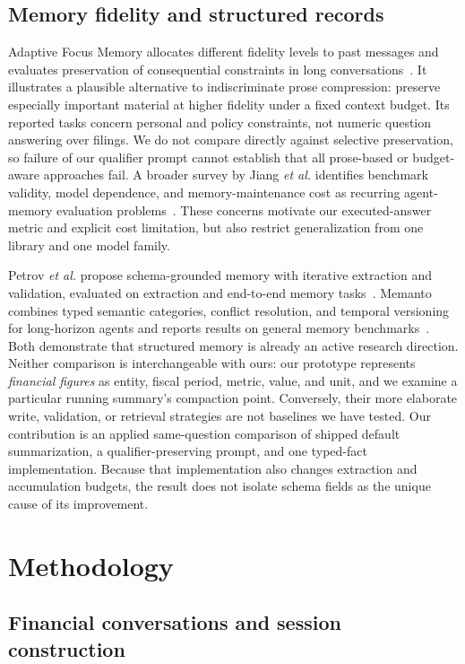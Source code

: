 \documentclass[conference,a4paper]{IEEEtran}
\begin{document}
\subsection{Memory fidelity and structured records}

Adaptive Focus Memory allocates different fidelity levels to past messages and evaluates preservation of consequential constraints in long conversations~\cite{cruz2025afm}. It illustrates a plausible alternative to indiscriminate prose compression: preserve especially important material at higher fidelity under a fixed context budget. Its reported tasks concern personal and policy constraints, not numeric question answering over filings. We do not compare directly against selective preservation, so failure of our qualifier prompt cannot establish that all prose-based or budget-aware approaches fail. A broader survey by Jiang \emph{et al.} identifies benchmark validity, model dependence, and memory-maintenance cost as recurring agent-memory evaluation problems~\cite{jiang2026anatomy}. These concerns motivate our executed-answer metric and explicit cost limitation, but also restrict generalization from one library and one model family.

Petrov \emph{et al.} propose schema-grounded memory with iterative extraction and validation, evaluated on extraction and end-to-end memory tasks~\cite{petrov2026schema}. Memanto combines typed semantic categories, conflict resolution, and temporal versioning for long-horizon agents and reports results on general memory benchmarks~\cite{abtahi2026memanto}. Both demonstrate that structured memory is already an active research direction. Neither comparison is interchangeable with ours: our prototype represents \emph{financial figures} as entity, fiscal period, metric, value, and unit, and we examine a particular running summary's compaction point. Conversely, their more elaborate write, validation, or retrieval strategies are not baselines we have tested. Our contribution is an applied same-question comparison of shipped default summarization, a qualifier-preserving prompt, and one typed-fact implementation. Because that implementation also changes extraction and accumulation budgets, the result does not isolate schema fields as the unique cause of its improvement.

\section{Methodology}

\subsection{Financial conversations and session construction}
\end{document}
